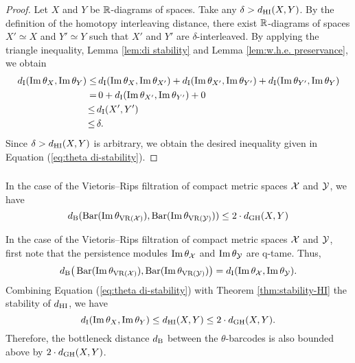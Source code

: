 \begin{proof}
    Let $X$ and $Y$ be $\mathbb{R}$-diagrams of spaces. 
    Take any $\delta > d_{\mathrm{HI}}(X,Y)$.
    By the definition of the homotopy interleaving distance, there exist $\mathbb{R}$-diagrams of spaces $X' \simeq X$ and $Y' \simeq Y$ such that $X'$ and $Y'$ are $\delta$-interleaved.
    By applying the triangle inequality, Lemma \ref{lem:di stability} and Lemma \ref{lem:w.h.e. preservance}, we obtain
    \begin{align*}
        d_{\mathrm{I}}(\operatorname{Im}\theta_{X}, \operatorname{Im}\theta_{Y}) \leq& \,
        d_{\mathrm{I}}(\operatorname{Im}\theta_{X}, \operatorname{Im}\theta_{X'}) + d_{\mathrm{I}}(\operatorname{Im}\theta_{X'}, \operatorname{Im}\theta_{Y'}) + d_{\mathrm{I}}(\operatorname{Im}\theta_{Y'}, \operatorname{Im}\theta_{Y}) \\ =& \, 
        0 + d_{\mathrm{I}}(\operatorname{Im}\theta_{X'}, \operatorname{Im}\theta_{Y'}) + 0 \\ \leq \,&
        d_{\mathrm{I}}(X',Y') \\ \leq \,&
        \delta.
    \end{align*}
    Since $\delta > d_{\mathrm{HI}}(X,Y)$ is arbitrary, we obtain the desired inequality given in Equation (\ref{eq:theta di-stability}).
\end{proof}

\subsubsection{}
\corollary
In the case of the Vietoris--Rips filtration of compact metric spaces $\mathcal{X}$ and $\mathcal{Y}$, we have
\[
d_{\mathrm{B}}(\operatorname{Bar}(\operatorname{Im} \theta_{\operatorname{VR}(\mathcal{X})}), \operatorname{Bar}(\operatorname{Im} \theta_{\operatorname{VR}(\mathcal{Y})})) \leq 2 \cdot d_{\mathrm{GH}}(X,Y)
\]


In the case of the Vietoris--Rips filtration of compact metric spaces $\mathcal{X}$ and $\mathcal{Y}$, first note that the persistence modules $\operatorname{Im}\theta_{\mathcal{X}}$ and $\operatorname{Im}\theta_{\mathcal{Y}}$ are q-tame.
Thus,
\[
d_{\mathrm{B}}\big(\operatorname{Bar}(\operatorname{Im} \theta_{\operatorname{VR}(\mathcal{X})}), \operatorname{Bar}(\operatorname{Im} \theta_{\operatorname{VR}(\mathcal{Y})})\big) =
d_{\mathrm{I}}(\operatorname{Im}\theta_{\mathcal{X}}, \operatorname{Im}\theta_{\mathcal{Y}}).
\]
Combining Equation (\ref{eq:theta di-stability}) with Theorem \ref{thm:stability-HI} the stability of $d_{\mathrm{HI}}$, we have
\[
d_{\mathrm{I}}(\operatorname{Im}\theta_{X}, \operatorname{Im}\theta_{Y}) \leq
d_{\mathrm{HI}}(X,Y)\leq 2\cdot d_{\mathrm{GH}}(X,Y).
\]
Therefore, the bottleneck distance $d_{\mathrm{B}}$ between the $\theta$-barcodes is also bounded above by $2\cdot d_{\mathrm{GH}}(X,Y)$.

